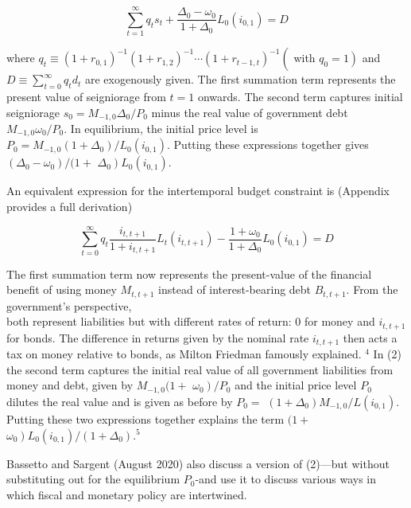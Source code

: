 \documentclass[10pt]{article}
\begin{document}
\begin{equation*}
\sum_{t=1}^{\infty} q_{t} s_{t}+\frac{\Delta_{0}-\omega_{0}}{1+\Delta_{0}} L_{0}\left(i_{0,1}\right)=D \tag{1}
\end{equation*}

where $q_{t} \equiv\left(1+r_{0,1}\right)^{-1}\left(1+r_{1,2}\right)^{-1} \cdots\left(1+r_{t-1, t}\right)^{-1}\left(\right.$ with $\left.q_{0}=1\right)$ and $D \equiv \sum_{t=0}^{\infty} q_{t} d_{t}$ are exogenously given. The first summation term represents the present value of seigniorage from $t=1$ onwards. The second term captures initial seigniorage $s_{0}=M_{-1,0} \Delta_{0} / P_{0}$ minus the real value of government debt $M_{-1,0} \omega_{0} / P_{0}$. In equilibrium, the initial price level is $P_{0}=M_{-1,0}\left(1+\Delta_{0}\right) / L_{0}\left(i_{0,1}\right)$. Putting these expressions together gives $\left(\Delta_{0}-\omega_{0}\right) /(1+$ $\left.\Delta_{0}\right) L_{0}\left(i_{0,1}\right)$.

An equivalent expression for the intertemporal budget constraint is (Appendix provides a full derivation)

\begin{equation*}
\sum_{t=0}^{\infty} q_{t} \frac{i_{t, t+1}}{1+i_{t, t+1}} L_{t}\left(i_{t, t+1}\right)-\frac{1+\omega_{0}}{1+\Delta_{0}} L_{0}\left(i_{0,1}\right)=D \tag{2}
\end{equation*}

The first summation term now represents the present-value of the financial benefit of using money $M_{t, t+1}$ instead of interest-bearing debt $B_{t, t+1}$. From the government's perspective,\\
both represent liabilities but with different rates of return: 0 for money and $i_{t, t+1}$ for bonds. The difference in returns given by the nominal rate $i_{t, t+1}$ then acts a tax on money relative to bonds, as Milton Friedman famously explained. ${ }^{4}$ In (2) the second term captures the initial real value of all government liabilities from money and debt, given by $M_{-1,0}(1+$ $\left.\omega_{0}\right) / P_{0}$ and the initial price level $P_{0}$ dilutes the real value and is given as before by $P_{0}=$ $\left(1+\Delta_{0}\right) M_{-1,0} / L\left(i_{0,1}\right)$. Putting these two expressions together explains the term $(1+$ $\left.\omega_{0}\right) L_{0}\left(i_{0,1}\right) /\left(1+\Delta_{0}\right) .{ }^{5}$

Bassetto and Sargent (August 2020) also discuss a version of (2)—but without substituting out for the equilibrium $P_{0}$-and use it to discuss various ways in which fiscal and monetary policy are intertwined.
\end{document}
